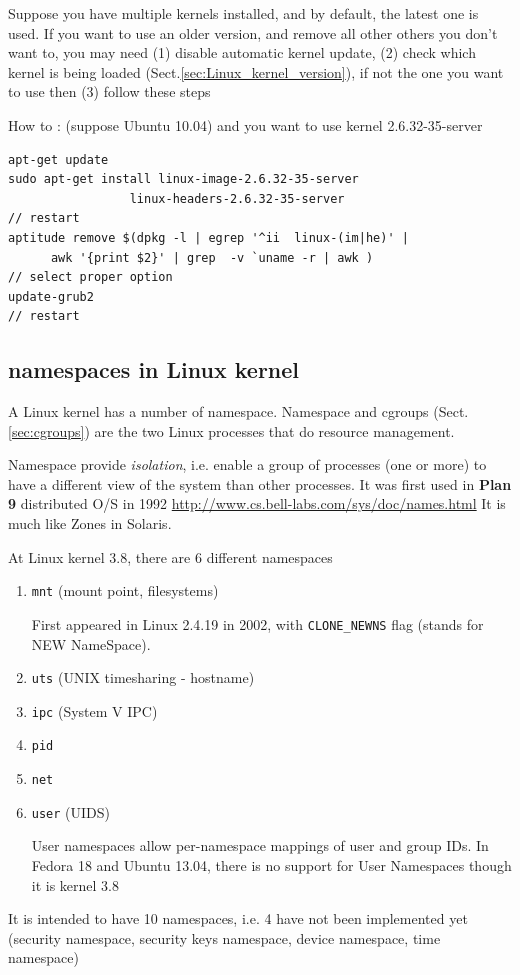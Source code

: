 Suppose you have multiple kernels installed, and by default, the latest one is
used. If you want to use an older version, and remove all other others you don't
want to, you may need (1) disable automatic kernel update, (2) check which
kernel is being loaded (Sect.\ref{sec:Linux_kernel_version}), if not the one you
want to use then (3) follow these steps

How to : (suppose Ubuntu 10.04) and you want to use kernel 2.6.32-35-server
\begin{verbatim}
apt-get update
sudo apt-get install linux-image-2.6.32-35-server 
                 linux-headers-2.6.32-35-server
// restart
aptitude remove $(dpkg -l | egrep '^ii  linux-(im|he)' | 
      awk '{print $2}' | grep  -v `uname -r | awk )
// select proper option
update-grub2
// restart
\end{verbatim}

\subsection{namespaces in Linux kernel}
\label{sec:namespaces}

A Linux kernel has a number of namespace. Namespace and cgroups
(Sect.\ref{sec:cgroups}) are the two Linux processes that do resource
management.

Namespace provide {\it isolation}, i.e. enable a group of processes (one or
more) to have a different view of the system than other processes. It was first
used in {\bf Plan 9} distributed O/S in 1992
\url{http://www.cs.bell-labs.com/sys/doc/names.html}
It is much like Zones in Solaris. 

At Linux kernel 3.8, there are 6 different namespaces
\begin{enumerate}
  \item \verb!mnt! (mount point, filesystems)
  
  First appeared in Linux 2.4.19 in 2002, with \verb!CLONE_NEWNS! flag (stands
  for NEW NameSpace).   
  \item \verb!uts! (UNIX timesharing - hostname)
  \item \verb!ipc! (System V IPC)
  \item \verb!pid!
  \item \verb!net!
  
  \item \verb!user! (UIDS)
  
  User namespaces allow per-namespace mappings of user and group IDs.
  In Fedora 18 and Ubuntu 13.04, there is no
support for User Namespaces though it is kernel 3.8
  
\end{enumerate}
It is intended to have 10 namespaces, i.e. 4 have not been implemented yet
(security namespace, security keys namespace, device namespace, time namespace)

